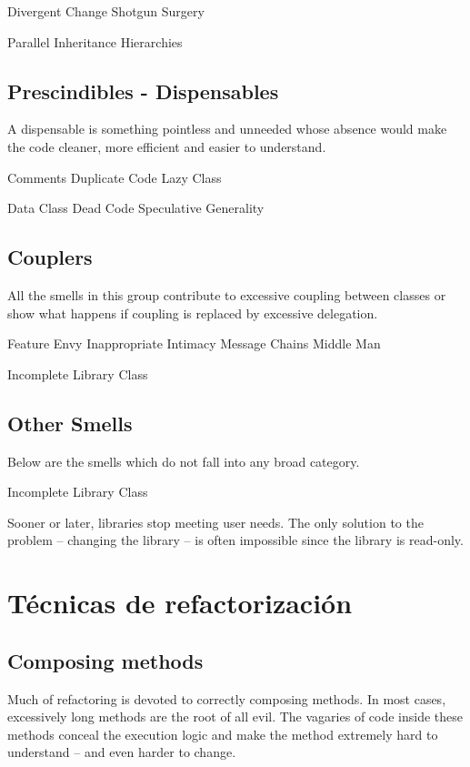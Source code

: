 \documentclass[11pt,a4paper,oneside]{book}
\begin{document}
    Divergent Change
    Shotgun Surgery

    Parallel Inheritance Hierarchies




\section{Prescindibles - Dispensables}

A dispensable is something pointless and unneeded whose absence would make the code cleaner, more efficient and easier to understand.

    Comments
    Duplicate Code
    Lazy Class

    Data Class
    Dead Code
    Speculative Generality



\section{Couplers}

All the smells in this group contribute to excessive coupling between classes or show what happens if coupling is replaced by excessive delegation.

    Feature Envy
    Inappropriate Intimacy
    Message Chains
    Middle Man

    Incomplete Library Class


\section{Other Smells}

Below are the smells which do not fall into any broad category.

Incomplete Library Class

Sooner or later, libraries stop meeting user needs. The only solution to the problem – changing the library – is often impossible since the library is read-only.



\chapter{Técnicas de refactorización}


\section{Composing methods}

Much of refactoring is devoted to correctly composing methods. In most cases, excessively long methods are the root of all evil. The vagaries of code inside these methods conceal the execution logic and make the method extremely hard to understand – and even harder to change.
\end{document}
